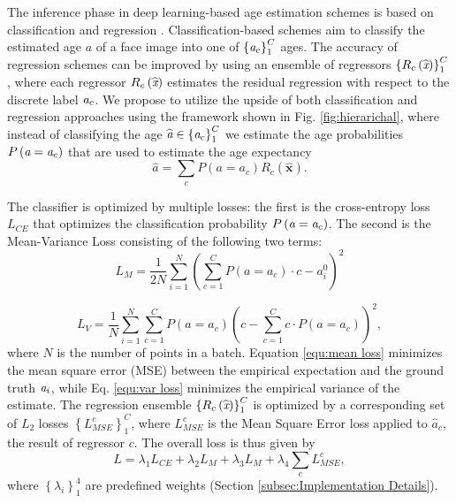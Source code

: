 \documentclass[10pt,journal]{IEEEtran}\usepackage{amsfonts}
\begin{document}
The inference phase in deep learning-based age estimation schemes is based on
classification \cite{leviage} and regression \cite{8099569, 7780901, 9145576,
coral}. Classification-based schemes aim to classify the estimated age $a$ of
a face image into one of $\left\{  \emph{a}_{c}\right\}  _{1}^{C}$ ages. The
accuracy of regression schemes can be improved by using an ensemble of
regressors $\left\{  R_{c}\left(  \widehat{\emph{x}}\right)  \right\}
_{1}^{C}$ \cite{8954134, 8578343}, where each regressor $R_{c}\left(
\widehat{\emph{x}}\right)  $ estimates the residual regression with respect to
the discrete label $\emph{a}_{c}$. We propose to utilize the upside of both
classification and regression approaches using the framework shown in Fig.
\ref{fig:hierarichal}, where instead of classifying the age $\widehat
{\emph{a}}\in\left\{  \emph{a}_{c}\right\}  _{1}^{C}$ we estimate the age
probabilities $P\left(  \emph{a}=\emph{a}_{c}\right)  $ that are used to
estimate the age expectancy
\begin{equation}
\widehat{a}=\sum_{c}P\left(  a=a_{c}\right)  R_{c}\left(  \widehat{\mathbf{x}}\right)  . \label{equ:expactancy}\end{equation}


The classifier is optimized by multiple losses: the first is the cross-entropy
loss $L_{CE}$ that optimizes the classification probability $P\left(
\emph{a}=\emph{a}_{c}\right)  $. The second is the Mean-Variance Loss
\cite{Mean-Variance} consisting of the following two terms:
\begin{equation}
L_{M}=\frac{1}{2N}\sum_{i=1}^{N}\left(  {\sum_{c=1}^{C}}P\left(
a=a_{c}\right)  \cdot c-a_{i}^{0}\right)  ^{2} \label{equ:mean loss}\end{equation}


\begin{equation}
L_{V}=\frac{1}{N}\sum_{i=1}^{N}{\sum_{c=1}^{C}P\left(  a=a_{c}\right)
}\left(  {c-\sum_{c=1}^{C}c\cdot P\left(  a=a_{c}\right)  }\right)  ^{2},
\label{equ:var loss}\end{equation}
where $N$ is the number of points in a batch. Equation \ref{equ:mean loss}
minimizes the mean square error (MSE) between the empirical expectation and
the ground truth $\emph{a}_{i}$, while Eq. \ref{equ:var loss} minimizes the
empirical variance of the estimate. The regression ensemble $\left\{
R_{c}\left(  \widehat{\emph{x}}\right)  \right\}  _{1}^{C}$ is optimized by a
corresponding set of $L_{2}$ losses $\left\{  L_{MSE}^{c}\right\}  _{1}^{C}$,
where $L_{MSE}^{c}$ is the Mean Square Error loss applied to $\widehat{a}_{c}$, the result of regressor $c$. The overall loss is thus given by
\begin{equation}
L=\lambda_{1}L_{CE}+\lambda_{2}L_{M}+\lambda_{3}L_{M}+\lambda_{4}\sum
_{c}L_{MSE}^{c}, \label{eq:totatl_loss_term}\end{equation}
where $\left\{  \lambda_{i}\right\}  _{1}^{4}$ are predefined weights
(Section \ref{subsec:Implementation Details}).
\end{document}
